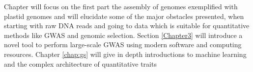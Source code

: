 Chapter \label{Chapter1} will focus on the first part the assembly of genomes exemplified
with plastid genomes and will elucidate some of the major obstacles presented, when
starting with raw DNA reads and going to data which is suitable for quantitative methods
like GWAS and genomic selection. Section \ref{Chapter3} will introduce a novel tool to
perform large-scale GWAS using modern software and computing resources. Chapter
\ref{chap:gs} will give in depth introductions to machine learning and the complex
architecture of quantitative traits 



